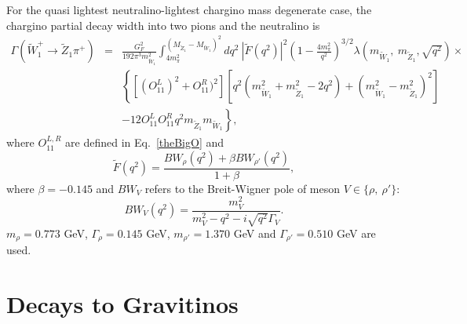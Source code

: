 \documentclass[final,3p,times]{elsarticle}
\begin{document}
For the quasi lightest neutralino-lightest chargino mass degenerate case, 
the chargino partial decay width into two pions and the neutralino is~\cite{gunionetal}
\begin{eqnarray}
\Gamma( {\tilde W}_1^+ \rightarrow {\tilde Z}_1 \pi^+) &=& 
\frac{G_F^2}{192 \pi^3 m_{{\tilde W}_1}^2} \int_{4 m_\pi^2}^{(M_{\tilde{Z}_1}-M_{\tilde{W}_1})^2}
dq^2\ \left| \tilde{F}(q^2)\right|^2 \left(1 - \frac{4 m_\pi^2}{q^2} \right)^{3/2}
\lambda(m_{\tilde{W}_1},\ m_{\tilde{Z}_1}, \sqrt{q^2}) \times \nonumber \\&&
\left\{ \left[ (O^L_{11})^2 +O^R_{11})^2\right] 
\left[ q^2(m_{{\tilde W}_1}^2 + m_{{\tilde Z}_1}^2-2q^2) +
(m_{{\tilde W}_1}^2 - m_{{\tilde Z}_1}^2)^2 \right] \right. \nonumber \\
&&\left. -12 O^L_{11} O^R_{11} q^2 m_{\tilde{Z}_1}m_{\tilde{W}_1}
\right\}, \label{chpipineut}
\end{eqnarray}
where $O^{L,R}_{11}$ are defined in Eq.~\ref{theBigO} and
\begin{equation}
\tilde{F}(q^2)=\frac{BW_\rho(q^2) + \beta BW_{\rho'}(q^2)}{1+\beta},
\end{equation}
where $\beta=-0.145$ and
$BW_V$ refers to the Breit-Wigner pole of meson $V \in \{ \rho,\ \rho' \}$:
\begin{equation}
BW_V(q^2) = \frac{m_V^2}{m_V^2 - q^2 - i \sqrt{q^2} \Gamma_V}.
\end{equation}
$m_\rho=0.773$ GeV, $\Gamma_\rho=0.145$ GeV, $m_{\rho'}=1.370$ GeV and
$\Gamma_{\rho'}=0.510$ GeV are used. 
\section{Decays to Gravitinos} \label{appendix:gravitinos}
\end{document}
